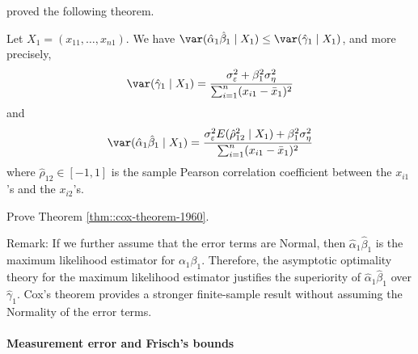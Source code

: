 \citet{cox1960jrssb} proved the following theorem.

\begin{theorem}
\label{thm::cox-theorem-1960}
Let $X_1 = (x_{11}, \ldots, x_{n1})$. 
We have $\var(\hat\alpha_1 \hat\beta_1 \mid X_1) \leq \var(\hat\gamma_1\mid X_1)$, and more precisely,
$$
\var(\hat\gamma_1\mid X_1) 
= \frac{   \sigma_\varepsilon^2     + \beta_1^2  \sigma_\eta^2   }{    \sum_{i=1}^n   (x_{i1} - \bar{x}_1)^2     }
$$
and
$$
\var(\hat\alpha_1 \hat\beta_1 \mid X_1) 
= \frac{   \sigma_\varepsilon^2   E(  \hat\rho_{12}^2 \mid X_1)   + \beta_1^2  \sigma_\eta^2   }{    \sum_{i=1}^n   (x_{i1} - \bar{x}_1)^2     }
$$
where $\hat\rho_{12} \in [-1,1]$ is the sample Pearson correlation coefficient between the $x_{i1}$'s and the $x_{i2}$'s. 
\end{theorem}


Prove Theorem \ref{thm::cox-theorem-1960}. 



Remark: If we further assume that the error terms are Normal, then $\hat\alpha_1 \hat\beta_1$ is the maximum likelihood estimator for $\alpha_1 \beta_1$. Therefore, the asymptotic optimality theory for the maximum likelihood estimator justifies the superiority of $\hat\alpha_1 \hat\beta_1$ over $\hat\gamma_1$. Cox's theorem provides a stronger finite-sample result without assuming the Normality of the error terms. 



\paragraph{Measurement error and Frisch's bounds}\label{hw11::measurement-error}



